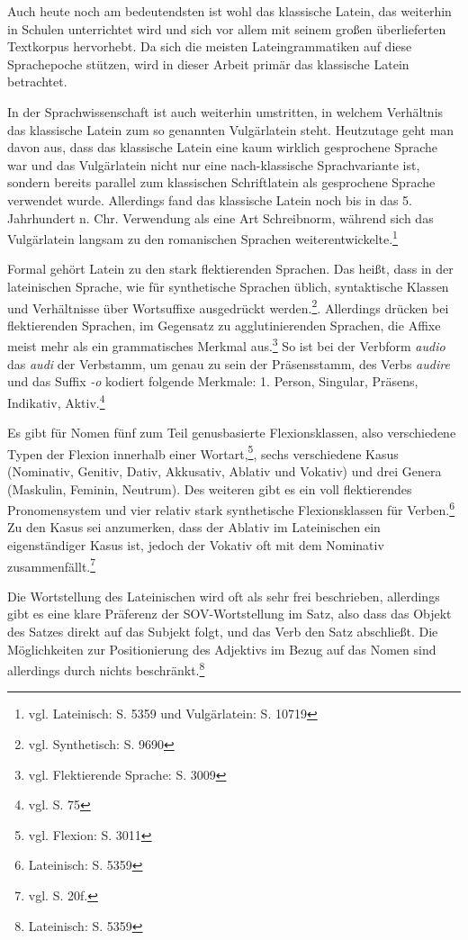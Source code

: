 Auch heute noch am bedeutendsten ist wohl das klassische Latein, das weiterhin in Schulen unterrichtet wird und sich vor allem mit seinem großen überlieferten Textkorpus hervorhebt. Da sich die meisten Lateingrammatiken auf diese Sprachepoche stützen, wird in dieser Arbeit primär das klassische Latein betrachtet. \par
In der Sprachwissenschaft ist auch weiterhin umstritten, in welchem Verhältnis das klassische Latein zum so genannten Vulgärlatein steht. Heutzutage geht man davon aus, dass das klassische Latein eine kaum wirklich gesprochene Sprache war und das Vulgärlatein nicht nur eine nach-klassische Sprachvariante ist, sondern bereits parallel zum klassischen Schriftlatein als gesprochene Sprache verwendet wurde. Allerdings fand das klassische Latein noch bis in das 5. Jahrhundert n. Chr. Verwendung als eine Art Schreibnorm, während sich das Vulgärlatein langsam zu den romanischen Sprachen weiterentwickelte.\footnote{vgl. \cite{METZLER2004} Lateinisch: S. 5359 und Vulgärlatein: S. 10719} \par
Formal gehört Latein zu den stark flektierenden Sprachen. Das heißt, dass in der lateinischen Sprache, wie für synthetische Sprachen üblich, syntaktische Klassen und Verhältnisse über Wortsuffixe ausgedrückt werden.\footnote{vgl. \cite{METZLER2004} Synthetisch: S. 9690}. Allerdings drücken bei flektierenden Sprachen, im Gegensatz zu agglutinierenden Sprachen, die Affixe meist mehr als ein grammatisches Merkmal aus.\footnote{vgl. \cite{METZLER2004} Flektierende Sprache: S. 3009} So ist bei der Verbform \textit{audio} das \textit{audi} der Verbstamm, um genau zu sein der Präsensstamm, des Verbs \textit{audire} und das Suffix \textit{-o} kodiert folgende Merkmale: 1. Person, Singular, Präsens, Indikativ, Aktiv.\footnote{vgl. \cite{BAYER-LINDAUER1994} S. 75} \par
Es gibt für Nomen fünf zum Teil genusbasierte Flexionsklassen, also verschiedene Typen der Flexion innerhalb einer Wortart,\footnote{vgl. \cite{METZLER2004} Flexion: S. 3011}, sechs verschiedene Kasus (Nominativ, Genitiv, Dativ, Akkusativ, Ablativ und Vokativ) und drei Genera (Maskulin, Feminin, Neutrum). Des weiteren gibt es ein voll flektierendes Pronomensystem und vier relativ stark synthetische Flexionsklassen für Verben.\footnote{\cite{METZLER2004} Lateinisch: S. 5359} Zu den Kasus sei anzumerken, dass der Ablativ im Lateinischen ein eigenständiger Kasus ist, jedoch der Vokativ oft mit dem Nominativ zusammenfällt.\footnote{vgl. \cite{BAYER-LINDAUER1994} S. 20f.} \par
Die Wortstellung des Lateinischen wird oft als sehr frei beschrieben, allerdings gibt es eine klare Präferenz der SOV-Wortstellung im Satz, also dass das Objekt des Satzes direkt auf das Subjekt folgt, und das Verb den Satz abschließt. Die Möglichkeiten zur Positionierung des Adjektivs im Bezug auf das Nomen sind allerdings durch nichts beschränkt.\footnote{\cite{METZLER2004} Lateinisch: S. 5359}

